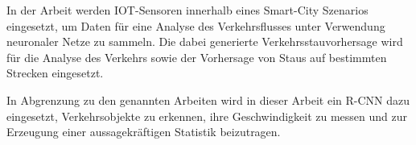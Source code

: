 In der Arbeit \cite{devi2017machine} werden \ac{IOT}-Sensoren innerhalb eines Smart-City Szenarios eingesetzt, um Daten für eine Analyse des Verkehrsflusses unter Verwendung neuronaler Netze zu sammeln. Die dabei generierte Verkehrsstauvorhersage wird für die Analyse des Verkehrs sowie der Vorhersage von Staus auf bestimmten Strecken eingesetzt.

In Abgrenzung zu den genannten Arbeiten wird in dieser Arbeit ein \ac{R-CNN} dazu eingesetzt, Verkehrsobjekte zu erkennen, ihre Geschwindigkeit zu messen und zur Erzeugung einer aussagekräftigen Statistik beizutragen.





